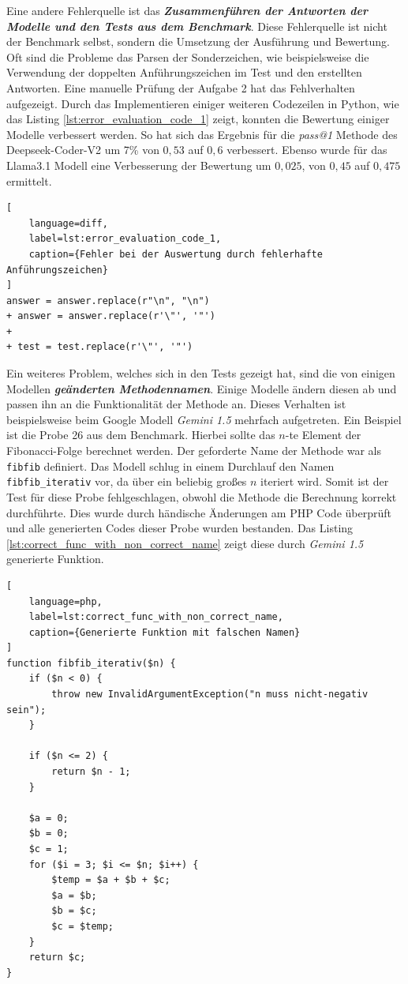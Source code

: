 Eine andere Fehlerquelle ist das \textit{\textbf{Zusammenführen der Antworten der Modelle und den Tests aus dem Benchmark}}. Diese Fehlerquelle ist nicht der Benchmark selbst, sondern die Umsetzung der Ausführung und Bewertung. Oft sind die Probleme das Parsen der Sonderzeichen, wie beispielsweise die Verwendung der doppelten Anführungszeichen im Test und den erstellten Antworten. Eine manuelle Prüfung der Aufgabe 2 hat das Fehlverhalten aufgezeigt. Durch das Implementieren einiger weiteren Codezeilen in Python, wie das Listing \ref{lst:error_evaluation_code_1} zeigt, konnten die Bewertung einiger Modelle verbessert werden. So hat sich das Ergebnis für die \textit{pass@1} Methode des Deepseek-Coder-V2 um 7\% von $0,53$ auf $0,6$ verbessert. Ebenso wurde für das Llama3.1 Modell eine Verbesserung der Bewertung um $0,025$, von $0,45$ auf $0,475$ ermittelt.\vspace{0.2cm}

\begin{lstlisting}[
	language=diff,
	label=lst:error_evaluation_code_1,
	caption={Fehler bei der Auswertung durch fehlerhafte Anführungszeichen}
]
answer = answer.replace(r"\n", "\n")
+ answer = answer.replace(r'\"', '"')
+ 
+ test = test.replace(r'\"', '"') 
\end{lstlisting}

Ein weiteres Problem, welches sich in den Tests gezeigt hat, sind die von einigen Modellen \textit{\textbf{geänderten Methodennamen}}. Einige Modelle ändern diesen ab und passen ihn an die Funktionalität der Methode an. Dieses Verhalten ist beispielsweise beim Google Modell \textit{Gemini 1.5} mehrfach aufgetreten. Ein Beispiel ist die Probe 26 aus dem Benchmark. Hierbei sollte das $n$-te Element der Fibonacci-Folge berechnet werden. Der geforderte Name der Methode war als \texttt{fibfib} definiert. Das Modell schlug in einem Durchlauf den Namen \texttt{fibfib\_iterativ} vor, da über ein beliebig großes $n$ iteriert wird. Somit ist der Test für diese Probe fehlgeschlagen, obwohl die Methode die Berechnung korrekt durchführte. Dies wurde durch händische Änderungen am PHP Code überprüft und alle generierten Codes dieser Probe wurden bestanden. Das Listing \ref{lst:correct_func_with_non_correct_name} zeigt diese durch \textit{Gemini 1.5} generierte Funktion.\vspace{0.2cm}

\begin{lstlisting}[
	language=php,
	label=lst:correct_func_with_non_correct_name,
	caption={Generierte Funktion mit falschen Namen}
]
function fibfib_iterativ($n) {
    if ($n < 0) {
        throw new InvalidArgumentException("n muss nicht-negativ sein");
    }

    if ($n <= 2) {
        return $n - 1;
    }

    $a = 0;
    $b = 0;
    $c = 1;
    for ($i = 3; $i <= $n; $i++) {
        $temp = $a + $b + $c;
        $a = $b;
        $b = $c;
        $c = $temp;
    }
    return $c;
}
\end{lstlisting}

